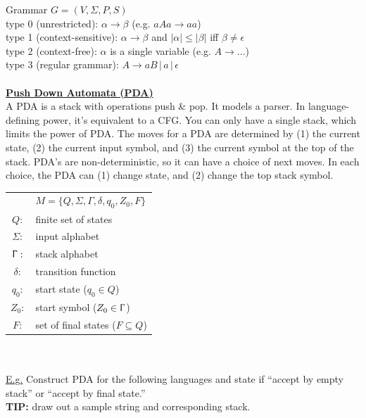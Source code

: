 \documentclass[8pt,letterpaper,twocolumn]{article}
\begin{document}
Grammar $G = (V, \Sigma, P, S)$ \\
type 0 (unrestricted): $\alpha \rightarrow \beta$ (e.g. $aAa \rightarrow aa$) \\
type 1 (context-sensitive): $\alpha \rightarrow \beta$ and $|\alpha| \leq |\beta|$ iff $\beta \neq \epsilon$ \\
type 2 (context-free): $\alpha$ is a single variable (e.g. $A \rightarrow ...$) \\
type 3 (regular grammar): $A \rightarrow aB \,|\, a \,|\, \epsilon$ \\
\\
\underline{\textbf{Push Down Automata (PDA)}} \\
A PDA is a stack with operations push \& pop. It models a parser.
In language-defining power, it's equivalent to a CFG.
You can only have a single stack, which limits the power of PDA.
The moves for a PDA are determined by (1) the current state, (2) the current input symbol, and
(3) the current symbol at the top of the stack.
PDA's are non-deterministic, so it can have a choice of next moves.
In each choice, the PDA can (1) change state, and (2) change the top stack symbol. \\
\begin{tabular}{c l}
 & $M = \{Q, \Sigma, \Gamma, \delta, q_0, Z_0, F\}$ \\
$Q:$ & finite set of states \\
$\Sigma:$ & input alphabet \\
$\Upgamma:$ & stack alphabet \\
$\delta:$ & transition function \\
$q_0:$ & start state ($q_0 \in Q$) \\
$Z_0:$ & start symbol ($Z_0 \in \Upgamma$) \\
$F:$ & set of final states ($F \subseteq Q$)
\end{tabular}
\\ \\
\underline{E.g.}
Construct PDA for the following languages and state if
``accept by empty stack'' or ``accept by final state.'' \\
\textbf{TIP:} draw out a sample string and corresponding stack.
\end{document}
